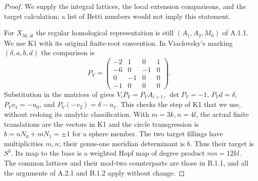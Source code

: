 \begin{proof}
We supply the integral lattices, the local extension
comparisons, and the target calculation; a list of
Betti numbers would not imply this statement.

For $X_{3k,4l}$ the regular homological representation
is still $(A_1,A_2,M_0)$ of A.1.1.  We use K1 with
its original finite-root convention.  In Viaclovsky's
marking $(\delta,a,b,d)$ the comparison is
\[
 P_V=\begin{pmatrix}-2&1&0&1\\-6&0&-1&0\\0&-1&0&0\\-1&0&0&0\end{pmatrix}.
\]
Substitution in the matrices of
\cite[Lemma 2.1 and equations (2.11)--(2.12)]{mapsViaLog}
gives $V_iP_V=P_VA_{i+1}$, $\det P_V=-1$,
$P_Vd=\delta$, $P_Vv_1=-u_0$, and
$P_V(-v_2)=\delta-u_1$.  This checks the step of
K1 that we use, without redoing its analytic
classification.  With $m=3k,n=4l$, the actual
finite translations are the vectors in K1 and
the circle transgression is
$b=nN_0+mN_1=\pm1$ for a sphere member.
The two target fillings have multiplicities $m,n$;
their genus-one meridian determinant is $b$.
Thus their target is $S^3$.  Its map to the base
is a weighted Hopf map of degree product $mn=12kl$.
The common lattices and their mod-two counterparts
are those in B.1.1, and all the arguments of
A.2.1 and B.1.2 apply without change.


\end{proof}
